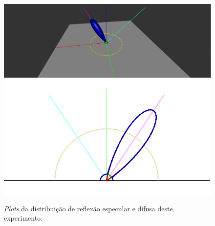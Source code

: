 \begin{figure}[H]
  
    \caption{\small{\textit{Plots} da distribuição de reflexão especular e difusa deste experimento.}}
    \label{fig-blinn-phong-plots}
    \vspace{42px}
  \includegraphics[width=\linewidth]{./Imagens/brdfs/blinn-phong-3D-plot}
\endminipage\hfill
{}
  \includegraphics[width=\linewidth]{./Imagens/brdfs/blinn-phong-polar-plot-log.png}
\endminipage\hfill
\end{figure}

